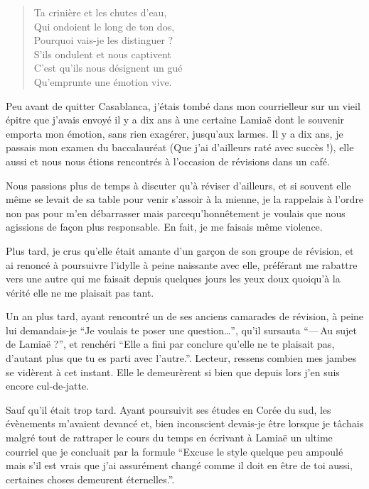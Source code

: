 \begin{verse}\sizain
  Ta crinière et les chutes d’eau,\\ 
  Qui ondoient le long de ton dos,\\ 
  Pourquoi vais-je les distinguer ?\\ 
  S’ils ondulent et nous captivent\\ 
  C’est qu’ils nous désignent un gué\\ 
  Qu’emprunte une émotion vive.  %
\end{verse}

\begin{prose}
  Peu avant de quitter Casablanca, j’étais tombé dans mon courrielleur sur un vieil épitre que j’avais envoyé il y a dix ans à une certaine Lamiaë dont le souvenir emporta mon émotion, sans rien exagérer, jusqu’aux larmes. Il y a dix ans, je passais mon examen du baccalauréat (Que j’ai d’ailleurs raté avec succès !), elle aussi et nous nous étions rencontrés à l’occasion de révisions dans un café.

  Nous passions plus de temps à discuter qu’à réviser d’ailleurs, et si souvent elle même se levait de sa table pour venir s’assoir à la mienne, je la rappelais à l’ordre non pas pour m’en débarrasser mais parcequ’honnêtement je voulais que nous agissions de façon plus responsable. En fait, je me faisais même violence.

  Plus tard, je crus qu’elle était amante d’un garçon de son groupe de révision, et ai renoncé à poursuivre l’idylle à peine naissante avec elle, préférant me rabattre vers une autre qui me faisait depuis quelques jours les yeux doux quoiqu’à la vérité elle ne me plaisait pas tant.

  Un an plus tard, ayant rencontré un de ses anciens camarades de révision, à peine lui demandais-je \enquote{Je voulais te poser une question…}, qu’il sursauta \enquote{—\,Au sujet de Lamiaë ?}, et renchéri \enquote{Elle a fini par conclure qu’elle ne te plaisait pas, d’autant plus que tu es parti avec l’autre.}. Lecteur, ressens combien mes jambes se vidèrent à cet instant. Elle le demeurèrent si bien que depuis lors j’en suis encore cul-de-jatte.

  Sauf qu’il était trop tard. Ayant poursuivit ses études en Corée du sud, les évènements m’avaient devancé et, bien inconscient devais-je être lorsque je tâchais malgré tout de rattraper le cours du temps  en écrivant à Lamiaë un ultime courriel que je concluait par la formule \enquote{Excuse le style quelque peu ampoulé mais s’il est vrais que j’ai assurément changé comme il doit en être de toi aussi, certaines choses demeurent éternelles.}.
\end{prose}

